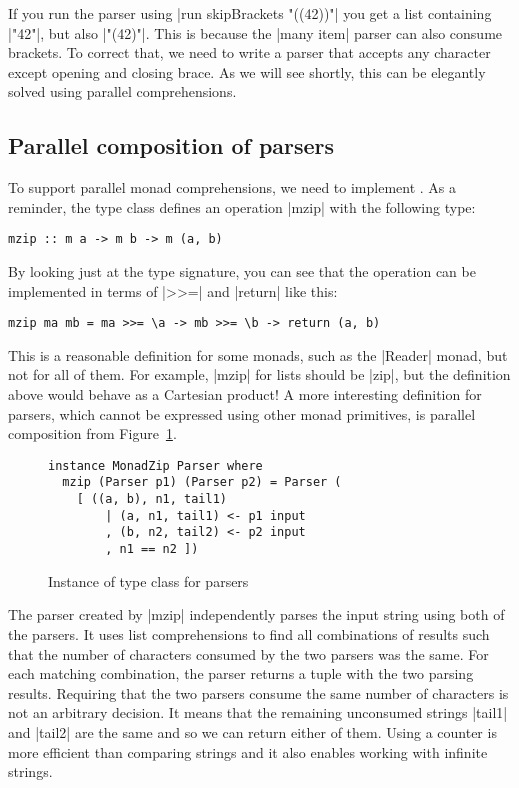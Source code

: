 \documentclass{tmr}
\newcommand{\authornote}[3]{}
\newcommand\bay[1]{\authornote{brent}{blue}{#1}}
\newcommand\tp[1]{\authornote{tomas}{red}{#1}}
\begin{document}
If you run the parser using |run skipBrackets "((42))"| you get a list containing |"42"|, but also 
|"(42)"|. This is because the |many item| parser can also consume brackets. To correct that, we need
to write a parser that accepts any character except opening and
closing brace. As we will see 
shortly, this can be elegantly solved using parallel comprehensions.


\subsection{Parallel composition of parsers}
\label{sec:parallel-parser-compos}
To support parallel monad comprehensions, we need to implement . 
As a reminder, the type class defines an operation |mzip| with the following type:

\begin{verbatim}
mzip :: m a -> m b -> m (a, b)
\end{verbatim}
By looking just at the type signature, you can see that the operation can be implemented in terms
of |>>=| and |return| like this:

 \bay{It would probably be good to actually
  spell out this definition.}
\tp{Added.}

\begin{verbatim}
mzip ma mb = ma >>= \a -> mb >>= \b -> return (a, b)
\end{verbatim}
This is a reasonable definition for some monads, such as the |Reader| monad, but not for all of 
them. For example, |mzip| for lists should be |zip|, but the definition above would behave as a
Cartesian product! A more interesting definition for parsers, which cannot be expressed using other 
monad primitives, is parallel composition from Figure~\ref{fig:monadzip-instance}.

\begin{figure}
\begin{verbatim}
instance MonadZip Parser where 
  mzip (Parser p1) (Parser p2) = Parser ( 
    [ ((a, b), n1, tail1) 
        | (a, n1, tail1) <- p1 input
        , (b, n2, tail2) <- p2 input
        , n1 == n2 ])
\end{verbatim}
\caption{Instance of  type class for parsers}
\label{fig:monadzip-instance}
\end{figure}

The parser created by |mzip| independently parses the input string using both of the parsers.
It uses list comprehensions to find all combinations of results such that the number of 
characters consumed by the two parsers was the same. For each matching combination, the parser 
returns a tuple with the two parsing results. Requiring that the two parsers consume the same 
number of characters is not an arbitrary decision. It means that the remaining unconsumed strings 
|tail1| and |tail2| are the same and so we can return either of them. Using a counter is more efficient
than comparing strings and it also enables working with infinite strings.
\end{document}
